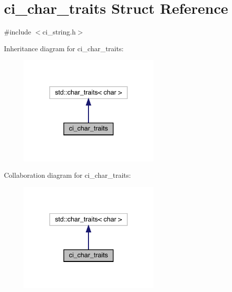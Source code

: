 \hypertarget{structci__char__traits}{}\section{ci\+\_\+char\+\_\+traits Struct Reference}
\label{structci__char__traits}


{\ttfamily \#include $<$ci\+\_\+string.\+h$>$}



Inheritance diagram for ci\+\_\+char\+\_\+traits\+:
\nopagebreak
\begin{figure}[H]
\begin{center}
\leavevmode
\includegraphics[width=198pt]{structci__char__traits__inherit__graph}
\end{center}
\end{figure}


Collaboration diagram for ci\+\_\+char\+\_\+traits\+:
\nopagebreak
\begin{figure}[H]
\begin{center}
\leavevmode
\includegraphics[width=198pt]{structci__char__traits__coll__graph}
\end{center}
\end{figure}
